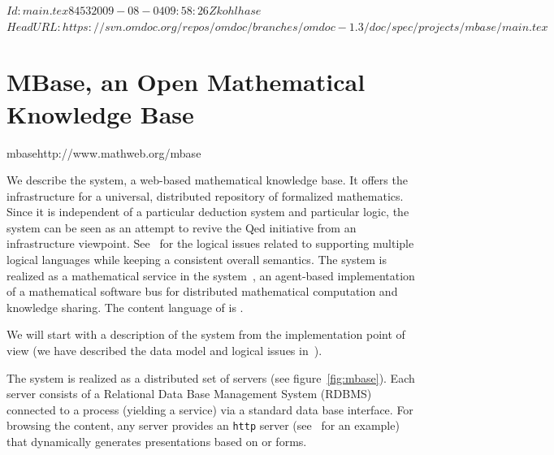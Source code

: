 \svnInfo $Id: main.tex 8453 2009-08-04 09:58:26Z kohlhase $
\svnKeyword $HeadURL: https://svn.omdoc.org/repos/omdoc/branches/omdoc-1.3/doc/spec/projects/mbase/main.tex $

\section[MBase]{MBase, an Open Mathematical Knowledge Base}
\begin{project}{mbase}{http://www.mathweb.org/mbase}
\end{project}

We describe the {\mbase} system, a web-based mathematical knowledge base. It offers the
infrastructure for a universal, distributed repository of formalized mathematics. Since it
is independent of a particular deduction system and particular logic, the {\mbase} system
can be seen as an attempt to revive the {\sc Qed} initiative  from an infrastructure
viewpoint. See~\cite{KohFra:rkcimss01} for the logical issues related to supporting
multiple logical languages while keeping a consistent overall semantics. The system is
realized as a mathematical service in the {\mathweb}
system~\cite{FraKoh:mabdl99,ZimmerMICAI04}, an agent-based implementation of a
mathematical software bus for distributed mathematical computation and knowledge
sharing. The content language of {\mbase} is {\omdoc}.

We will start with a description of the system from the implementation point of
view (we have described the data model and logical issues
in~\cite{KohFra:rkcimss01}).  

The {\mbase} system is realized as a distributed set of {\mbase} servers (see
figure~\ref{fig:mbase}). Each {\mbase} server consists of a Relational Data Base
Management System (RDBMS) connected to a {\mozart} process (yielding a {\mathweb} service)
via a standard data base interface.  For browsing the {\mbase} content, any {\mbase}
server provides an {\tt http} server (see~\cite{MBase-Demo:URL} for an example) that
dynamically generates presentations based on {\html} or {\xml} forms.

